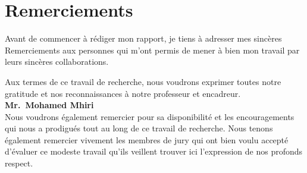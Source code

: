 \section*{Remerciements}
\vspace{1.0in}
\begin{center}

    Avant de commencer à rédiger mon rapport, je tiens à adresser mes sincères
    Remerciements aux personnes qui m'ont permis de mener à bien mon travail
    par leurs sincères collaborations.

    Aux termes de ce travail de recherche, nous voudrons exprimer toutes notre
    gratitude et nos reconnaissances à notre professeur et encadreur.
    \\[0.2in]

    \textbf{Mr.\ Mohamed Mhiri}
    \\[0.2in]

    Nous voudrons également remercier pour sa disponibilité et les
    encouragements qui nous a prodigués tout au long de ce travail de
    recherche.  Nous tenons également remercier vivement les membres de jury
    qui ont bien voulu accepté d'évaluer ce modeste travail qu'ils veillent
    trouver ici l'expression de nos profonds respect.

\end{center}
